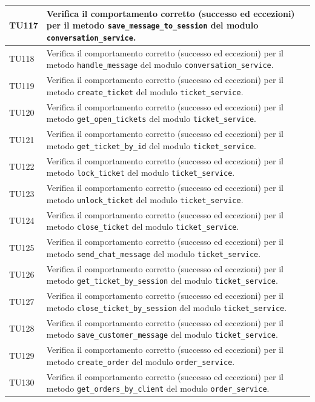 \documentclass[a4paper,11pt,oneside]{scrartcl}
\begin{document}
\begin{longtable}{|p{1.9cm}|p{11.6cm}|c|}
TU117 & Verifica il comportamento corretto (successo ed eccezioni) per il metodo \texttt{save\_message\_to\_session} del modulo \texttt{conversation\_service}. & \\ \hline
TU118 & Verifica il comportamento corretto (successo ed eccezioni) per il metodo \texttt{handle\_message} del modulo \texttt{conversation\_service}. & \\ \hline
TU119 & Verifica il comportamento corretto (successo ed eccezioni) per il metodo \texttt{create\_ticket} del modulo \texttt{ticket\_service}. & \\ \hline
TU120 & Verifica il comportamento corretto (successo ed eccezioni) per il metodo \texttt{get\_open\_tickets} del modulo \texttt{ticket\_service}. & \\ \hline
TU121 & Verifica il comportamento corretto (successo ed eccezioni) per il metodo \texttt{get\_ticket\_by\_id} del modulo \texttt{ticket\_service}. & \\ \hline
TU122 & Verifica il comportamento corretto (successo ed eccezioni) per il metodo \texttt{lock\_ticket} del modulo \texttt{ticket\_service}. & \\ \hline
TU123 & Verifica il comportamento corretto (successo ed eccezioni) per il metodo \texttt{unlock\_ticket} del modulo \texttt{ticket\_service}. & \\ \hline
TU124 & Verifica il comportamento corretto (successo ed eccezioni) per il metodo \texttt{close\_ticket} del modulo \texttt{ticket\_service}. & \\ \hline
TU125 & Verifica il comportamento corretto (successo ed eccezioni) per il metodo \texttt{send\_chat\_message} del modulo \texttt{ticket\_service}. & \\ \hline
TU126 & Verifica il comportamento corretto (successo ed eccezioni) per il metodo \texttt{get\_ticket\_by\_session} del modulo \texttt{ticket\_service}. & \\ \hline
TU127 & Verifica il comportamento corretto (successo ed eccezioni) per il metodo \texttt{close\_ticket\_by\_session} del modulo \texttt{ticket\_service}. & \\ \hline
TU128 & Verifica il comportamento corretto (successo ed eccezioni) per il metodo \texttt{save\_customer\_message} del modulo \texttt{ticket\_service}. & \\ \hline
TU129 & Verifica il comportamento corretto (successo ed eccezioni) per il metodo \texttt{create\_order} del modulo \texttt{order\_service}. & \\ \hline
TU130 & Verifica il comportamento corretto (successo ed eccezioni) per il metodo \texttt{get\_orders\_by\_client} del modulo \texttt{order\_service}. & \\ \hline

\end{longtable}
\end{document}
